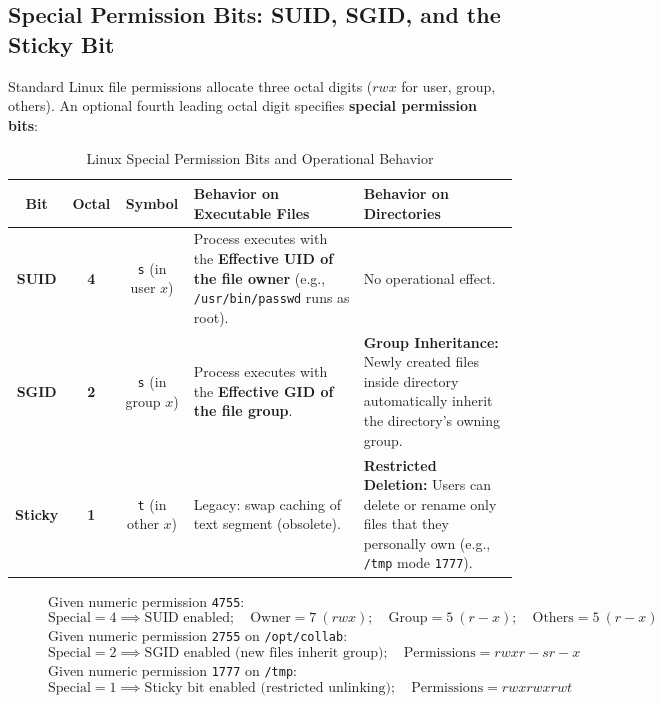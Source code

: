 \subsection{Special Permission Bits: SUID, SGID, and the Sticky Bit}
Standard Linux file permissions allocate three octal digits ($rwx$ for user, group, others). An optional fourth leading octal digit specifies \textbf{special permission bits}:
\begin{table}[htbp]
\centering
\small
\caption{Linux Special Permission Bits and Operational Behavior}
\label{tab:special_permissions}
\begin{tabularx}{\textwidth}{c c c p{4cm} X}
\toprule
\textbf{Bit} & \textbf{Octal} & \textbf{Symbol} & \textbf{Behavior on Executable Files} & \textbf{Behavior on Directories} \\
\midrule
\textbf{SUID} & \textbf{4} & \texttt{s} (in user $x$) & Process executes with the \textbf{Effective UID of the file owner} (e.g., \texttt{/usr/bin/passwd} runs as root). & No operational effect. \\
\textbf{SGID} & \textbf{2} & \texttt{s} (in group $x$) & Process executes with the \textbf{Effective GID of the file group}. & \textbf{Group Inheritance:} Newly created files inside directory automatically inherit the directory's owning group. \\
\textbf{Sticky} & \textbf{1} & \texttt{t} (in other $x$) & Legacy: swap caching of text segment (obsolete). & \textbf{Restricted Deletion:} Users can delete or rename only files that they personally own (e.g., \texttt{/tmp} mode \texttt{1777}). \\
\bottomrule
\end{tabularx}
\end{table}

\begin{figure}[htbp]
\centering
\begin{tcolorbox}[colback=codebg, colframe=primary, title=\textbf{Special Permission Mathematical Parsing}]
Given numeric permission \texttt{4755}:
\begin{equation}
\text{Special} = 4 \implies \text{SUID enabled}; \quad \text{Owner} = 7 \ (rwx); \quad \text{Group} = 5 \ (r-x); \quad \text{Others} = 5 \ (r-x)
\end{equation}
Given numeric permission \texttt{2755} on \texttt{/opt/collab}:
\begin{equation}
\text{Special} = 2 \implies \text{SGID enabled (new files inherit group)}; \quad \text{Permissions} = rwxr-sr-x
\end{equation}
Given numeric permission \texttt{1777} on \texttt{/tmp}:
\begin{equation}
\text{Special} = 1 \implies \text{Sticky bit enabled (restricted unlinking)}; \quad \text{Permissions} = rwxrwxrwt
\end{equation}
\end{tcolorbox}
\end{figure}

